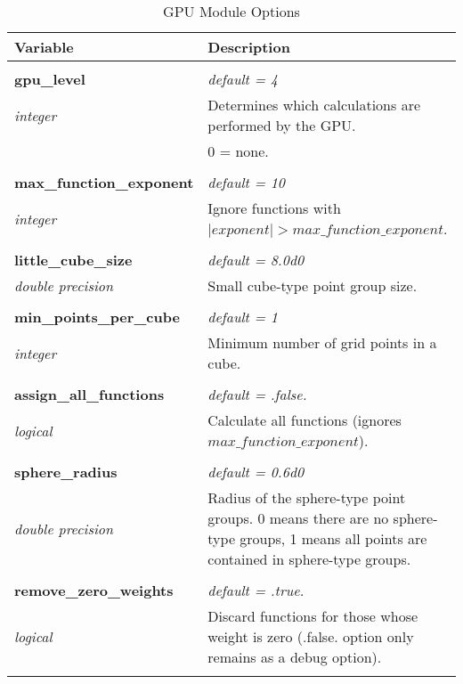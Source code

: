 \begin{Spacing}{1.0}
\begin{longtable}{ p{} p{} }

   \toprule
   \textbf{Variable} & Description \\*
   \midrule \\*
   \endhead

   \bottomrule
   \caption{GPU Module Options}
   \endfoot

   \textbf{gpu\_level}
   &  \textit{default = 4}
   \\*\textit{integer}
   & Determines which calculations are performed by
   the GPU.\\*
   &     0 = none.\\* \\

   \textbf{max\_function\_exponent}
   &  \textit{default = 10}
   \\*\textit{integer}
   & Ignore functions with $\lvert exponent \rvert > 
   max\_function\_exponent$.\\* \\

   \textbf{little\_cube\_size}
   &  \textit{default = 8.0d0}
   \\*\textit{double precision}
   & Small cube-type point group size.\\* \\

   \textbf{min\_points\_per\_cube}
   &  \textit{default = 1}
   \\*\textit{integer}
   & Minimum number of grid points in a cube.\\* \\

   \textbf{assign\_all\_functions}
   &  \textit{default = .false. }
   \\*\textit{logical}
   & Calculate all functions (ignores
   $max\_function\_exponent$).\\* \\

   \textbf{sphere\_radius}
   &  \textit{default = 0.6d0}
   \\*\textit{double precision}
   & Radius of the sphere-type point groups. 0 means
   there are no sphere-type groups, 1 means all points
   are contained in sphere-type groups.\\* \\

   \textbf{remove\_zero\_weights}
   &  \textit{default = .true. }
   \\*\textit{logical}
   & Discard functions for those whose weight is zero
   (.false. option only remains as a debug option).
   \\* \\


\end{longtable}
\end{Spacing}
